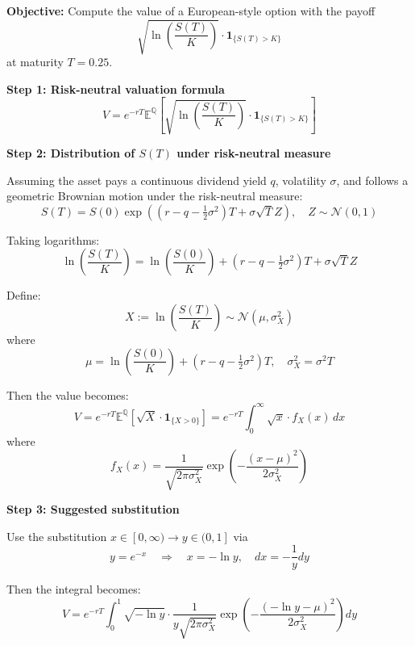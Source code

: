 \documentclass{article}
\begin{document}
\textbf{Objective:} Compute the value of a European-style option with the payoff
\[
    \sqrt{\ln\left(\frac{S(T)}{K}\right)} \cdot \mathbf{1}_{\{S(T) > K\}}
\]
at maturity \( T = 0.25 \).

\vspace{1em}

\textbf{Step 1: Risk-neutral valuation formula}
\[
    V = e^{-rT} \mathbb{E}^{\mathbb{Q}}\left[\sqrt{\ln\left(\frac{S(T)}{K}\right)} \cdot \mathbf{1}_{\{S(T) > K\}} \right]
\]

\vspace{1em}

\textbf{Step 2: Distribution of \( S(T) \) under risk-neutral measure}

Assuming the asset pays a continuous dividend yield \( q \), volatility \( \sigma \), and follows a geometric Brownian motion under the risk-neutral measure:
\[
    S(T) = S(0) \exp\left((r - q - \tfrac{1}{2}\sigma^2)T + \sigma \sqrt{T} Z\right), \quad Z \sim \mathcal{N}(0, 1)
\]

Taking logarithms:
\[
    \ln\left(\frac{S(T)}{K}\right) = \ln\left(\frac{S(0)}{K}\right) + (r - q - \tfrac{1}{2}\sigma^2)T + \sigma \sqrt{T} Z
\]

Define:
\[
    X := \ln\left(\frac{S(T)}{K}\right) \sim \mathcal{N}(\mu, \sigma_X^2)
\]
where
\[
    \mu = \ln\left(\frac{S(0)}{K}\right) + (r - q - \tfrac{1}{2}\sigma^2)T,\quad \sigma_X^2 = \sigma^2 T
\]

Then the value becomes:
\[
    V = e^{-rT} \mathbb{E}^{\mathbb{Q}}\left[\sqrt{X} \cdot \mathbf{1}_{\{X > 0\}} \right]
    = e^{-rT} \int_0^{\infty} \sqrt{x} \cdot f_X(x) \, dx
\]
where
\[
    f_X(x) = \frac{1}{\sqrt{2\pi \sigma_X^2}} \exp\left( -\frac{(x - \mu)^2}{2 \sigma_X^2} \right)
\]

\vspace{1em}

\textbf{Step 3: Suggested substitution}

Use the substitution \( x \in [0, \infty) \rightarrow y \in (0, 1] \) via
\[
    y = e^{-x} \quad \Rightarrow \quad x = -\ln y, \quad dx = -\frac{1}{y} dy
\]

Then the integral becomes:
\[
    V = e^{-rT} \int_0^1 \sqrt{-\ln y} \cdot \frac{1}{y \sqrt{2\pi \sigma_X^2}}
    \exp\left( -\frac{(-\ln y - \mu)^2}{2\sigma_X^2} \right) dy
\]
\end{document}
